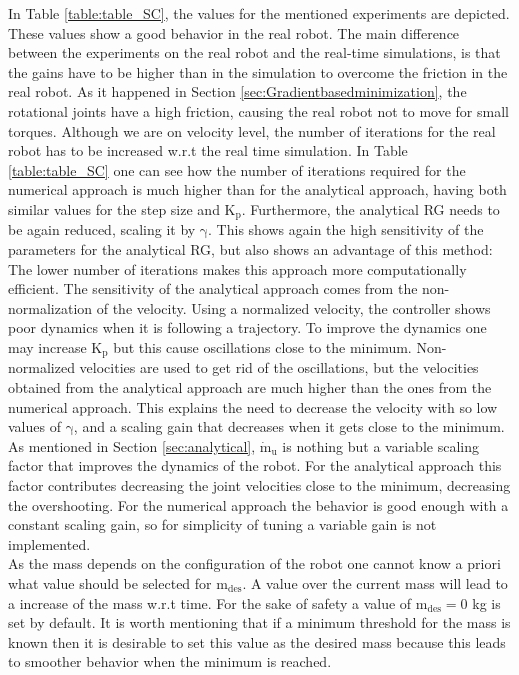 In Table \ref{table:table_SC}, the values for the mentioned experiments are depicted. These values show a good behavior in the real robot. The main difference between the experiments on the real robot and the real-time simulations, is that the gains have to be higher than in the simulation to overcome the friction in the real robot. As it happened in Section \ref{sec:Gradientbasedminimization}, the rotational joints have a high friction, causing the real robot not to move for small torques. Although we are on velocity level, the number of iterations for the real robot has to be increased w.r.t the real time simulation. 
 In Table \ref{table:table_SC} one can see how the number of iterations required for the numerical approach is much higher than for the analytical approach, having both similar values for the step size and $\mathrm{K_p}$. Furthermore, the analytical RG needs to be again  reduced, scaling it by $\mathrm{\gamma}$. This shows again the high sensitivity of the parameters for the analytical RG, but also shows an advantage of this method: The lower number of iterations makes this approach more computationally efficient. The sensitivity of the analytical approach comes from the non-normalization of the velocity. Using a normalized velocity, the controller shows poor dynamics when it is following a trajectory. To improve the dynamics one may increase $\mathrm{K_p}$ but this cause oscillations close to the minimum. Non-normalized velocities are used to get rid of the oscillations, but the velocities obtained from the analytical approach are much higher than the ones from the numerical approach. This explains the need to decrease the velocity with so low values of $\mathrm{\gamma}$, and a scaling gain that decreases when it gets close to the minimum.
As mentioned in Section \ref{sec:analytical},  $\mathrm{\dot{m}_u}$ is nothing but a variable scaling factor that improves the dynamics of the robot. For the analytical approach this factor contributes decreasing the joint velocities close to the minimum, decreasing the overshooting.
For the numerical approach the behavior is good enough with a constant scaling gain, so for simplicity of tuning a variable gain is not implemented.  \\
As the mass depends on the  configuration of the robot one cannot know a priori what value should be selected for $\mathrm{m_{des}}$. A value over the current mass will lead to a increase of the mass w.r.t time. 
For the sake of safety a value of $\mathrm{m_{des}=0}$ kg is set by default. It is worth mentioning that if a minimum threshold for the mass is known then it is desirable to set this value as the desired mass because this leads to smoother behavior when the minimum is reached.




